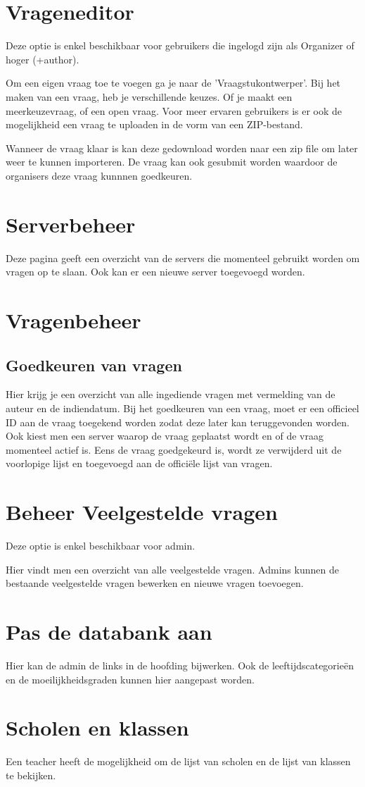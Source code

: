 \documentclass[]{article}
\begin{document}
\section{Vrageneditor}

Deze optie is enkel beschikbaar voor gebruikers die ingelogd zijn als Organizer of hoger (+author).

Om een eigen vraag toe te voegen ga je naar de 'Vraagstukontwerper'. Bij het maken van een vraag, heb je verschillende keuzes. Of je maakt een meerkeuzevraag, of een open vraag. Voor meer ervaren gebruikers is er ook de mogelijkheid een vraag te uploaden in de vorm van een ZIP-bestand.

Wanneer de vraag klaar is kan deze gedownload worden naar een zip file om later weer te kunnen importeren. De vraag kan ook
gesubmit worden waardoor de organisers deze vraag kunnnen goedkeuren.

\section{Serverbeheer}

Deze pagina geeft een overzicht van de servers die momenteel gebruikt worden om vragen op te slaan.
Ook kan er een nieuwe server toegevoegd worden.

\section{Vragenbeheer}

\subsection{Goedkeuren van vragen}
Hier krijg je een overzicht van alle ingediende vragen met vermelding van de auteur en de indiendatum.
Bij het goedkeuren van een vraag, moet er een officieel ID aan de vraag toegekend worden zodat deze later kan teruggevonden worden.
Ook kiest men een server waarop de vraag geplaatst wordt en of de vraag momenteel actief is. Eens de vraag goedgekeurd is, wordt
ze verwijderd uit de voorlopige lijst en toegevoegd aan de officiële lijst van vragen.

\section{Beheer Veelgestelde vragen}

Deze optie is enkel beschikbaar voor admin.

Hier vindt men een overzicht van alle veelgestelde vragen. Admins kunnen de bestaande veelgestelde vragen bewerken en nieuwe vragen toevoegen.

\section{Pas de databank aan}
Hier kan de admin de links in de hoofding bijwerken. Ook de leeftijdscategorieën en de moeilijkheidsgraden kunnen hier aangepast worden.

\section{Scholen en klassen}
Een teacher heeft de mogelijkheid om de lijst van scholen en de lijst van klassen te bekijken.
\end{document}
